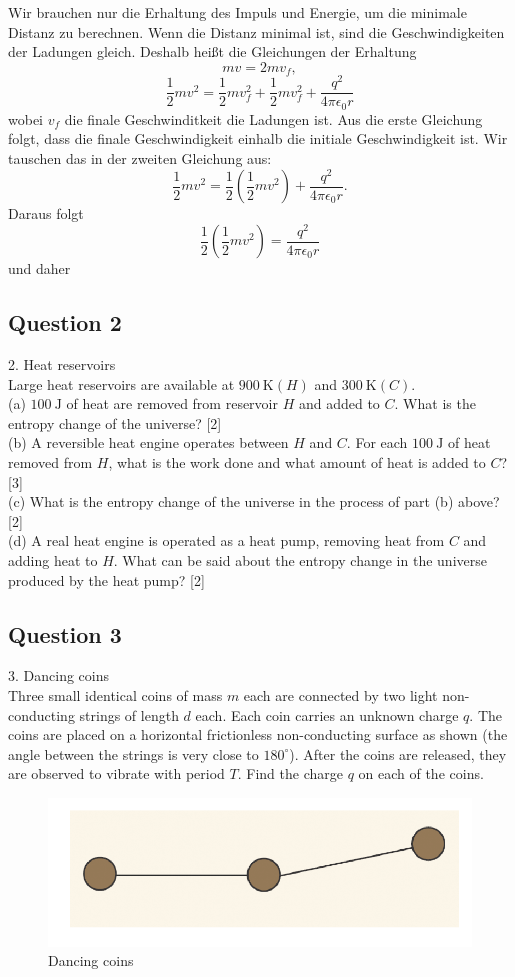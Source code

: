 \documentclass{article}
\begin{document}
Wir brauchen nur die Erhaltung des Impuls und Energie, um die minimale Distanz zu berechnen. Wenn die Distanz minimal ist, sind die Geschwindigkeiten der Ladungen gleich. Deshalb heißt die Gleichungen der Erhaltung
\[mv=2mv_f,\]
\[\frac 12mv^2=\frac 12 mv_f^2 + \frac 12 mv_f^2+\frac{q^2}{4\pi\epsilon_0 r}\]
wobei $v_f$ die finale Geschwinditkeit die Ladungen ist. Aus die erste Gleichung folgt, dass die finale Geschwindigkeit einhalb die initiale Geschwindigkeit ist. Wir tauschen das in der zweiten Gleichung aus:
\[\frac 12 mv^2=\frac 12\left(\frac 12mv^2\right)+\frac{q^2}{4\pi\epsilon_0 r}.\]
Daraus folgt
\[\frac 12\left(\frac 12mv^2\right)=\frac{q^2}{4\pi\epsilon_0 r}\]
und daher
\subsection{Question 2}
2. Heat reservoirs \\
Large heat reservoirs are available at $900 \mathrm{~K}(H)$ and $300 \mathrm{~K}(C)$. \\
(a) $100 \mathrm{~J}$ of heat are removed from reservoir $H$ and added to $C .$ What is the entropy change of the universe? [2] \\
(b) A reversible heat engine operates between $H$ and $C .$ For each $100 \mathrm{~J}$ of heat removed from $H$, what is the work done and what amount of heat is added to $C$? [3] \\
(c) What is the entropy change of the universe in the process of part (b) above? [2] \\
(d) A real heat engine is operated as a heat pump, removing heat from $C$ and adding heat to $H .$ What can be said about the entropy change in the universe produced by the heat pump? [2]

\subsection{Question 3}
3. Dancing coins \\
Three small identical coins of mass $m$ each are connected by two light non-conducting strings of length $d$ each. Each coin carries an unknown charge $q$. The coins are placed on a horizontal frictionless non-conducting surface as shown (the angle between the strings is very close to $180^{\circ}$). After the coins are released, they are observed to vibrate with period $T$. Find the charge $q$ on each of the coins.

\begin{figure}
	\centering
	\includegraphics[width=0.5\linewidth]{spho_book_TYS_images/2015q3.png}
	\caption{Dancing coins}
\end{figure}
\end{document}
